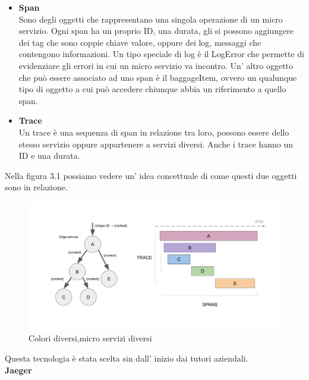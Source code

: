 \documentclass[a4paper,12pt,titlepage,italian,openany]{report}
\begin{document}
\begin{itemize}
    \item \textbf{Span}\\
    Sono degli oggetti che rappresentano una singola operazione di un micro servizio. Ogni span ha un proprio ID, una durata, 
    gli si possono aggiungere dei tag che sono coppie chiave valore, oppure dei log, messaggi che contengono informazioni. Un tipo speciale di log è il LogError che permette
    di evidenziare gli errori in cui un micro servizio va incontro. Un' altro oggetto che può essere associato ad uno span è il baggageItem, ovvero un qualunque tipo di oggetto a cui può accedere chiunque abbia un riferimento a quello span.
    \newpage
    \item  \textbf{Trace}\\
    Un trace è una sequenza di span in relazione tra loro, possono essere dello stesso servizio oppure appartenere a servizi diversi. Anche i trace hanno un ID e una durata.
   
\end{itemize}

Nella figura 3.1 possiamo vedere un' idea concettuale di come questi due oggetti sono in relazione.\\




\begin{figure}[H]
    
    \includegraphics[scale=0.4]{1.png}
    \centering
    \caption{Colori diversi,micro servizi diversi}
\end{figure}
Questa tecnologia è stata scelta sin dall' inizio dai tutori aziendali.\\[12pt]
\textbf{Jaeger}\\
\end{document}
